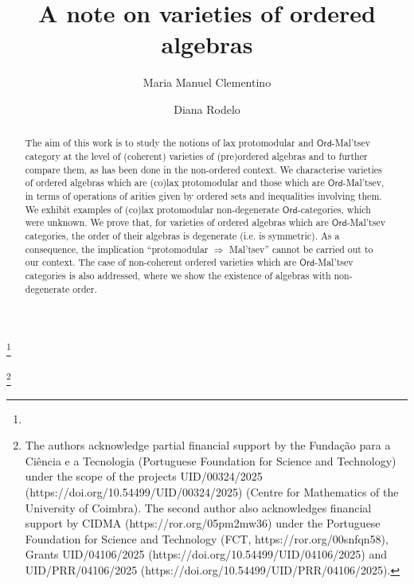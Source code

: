 \documentclass[11pt]{amsart}
\theoremstyle{plain}
\theoremstyle{definition}
\theoremstyle{remark}
\newcommand{\Ord}{\ensuremath{\mathsf{Ord}}}
\begin{document}
\title{A note on varieties of ordered algebras}

\author{Maria Manuel Clementino}
\address{CMUC, Department of Mathematics, University of
Coimbra, 3000-143 Coimbra, Portugal}\thanks{}


\author{Diana Rodelo}
\address{Department of Mathematics, University of the Algarve, 8005-139 Faro, Portugal and Center for Research and Development in Mathematics and Applications (CIDMA), Department of Mathematics, University of Aveiro, 3810-193 Aveiro, Portugal}
\thanks{The authors acknowledge partial financial support by the Fundação para a Ciência e a Tecnologia (Portuguese Foundation for Science and Technology) under the scope of the projects UID/00324/2025 (https://doi.org/10.54499/UID/00324/2025) (Centre for Mathematics of the University of Coimbra).
The second author also acknowledges financial support by CIDMA (https://ror.org/05pm2mw36)
under the Portuguese Foundation for Science and Technology
(FCT, https://ror.org/00snfqn58), Grants UID/04106/2025 (https://doi.org/10.54499/UID/04106/2025)
and UID/PRR/04106/2025 (https://doi.org/10.54499/UID/PRR/04106/2025).
}



\begin{abstract}
The aim of this work is to study the notions of lax protomodular and $\Ord$-Mal'tsev category
at the level of (coherent) varieties of (pre)ordered algebras and to further compare them, as has been done in the non-ordered context. We characterise varieties of ordered algebras which are (co)lax protomodular and those which are $\Ord$-Mal'tsev, in terms of operations of arities given by ordered sets and inequalities involving them.
We exhibit examples of (co)lax protomodular non-degenerate $\Ord$-categories, which were unknown. We prove that, for varieties of ordered algebras which are $\Ord$-Mal'tsev categories, the order of their algebras is degenerate (i.e. is symmetric). As a consequence, the implication ``protomodular $\Rightarrow$ Mal'tsev'' cannot be carried out to our %
context. The case of non-coherent ordered varieties which are $\Ord$-Mal'tsev categories is also addressed, where we show the existence of algebras with non-degenerate order.
\end{abstract}
\end{document}
